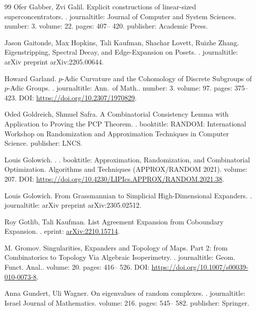 \begin{thebibliography}{99}
Ofer Gabber, Zvi Galil.
\newblock Explicit constructions of linear-sized superconcentrators.
.
\newblock journaltitle: Journal of Computer and System Sciences.
\newblock number: 3.
\newblock volume: 22.
\newblock pages: 407-- 420.
\newblock publisher: Academic Press.

Jason Gaitonde, Max Hopkins, Tali Kaufman, Shachar Lovett, Ruizhe Zhang.
\newblock Eigenstripping, Spectral Decay, and Edge-Expansion on Posets.
.
\newblock journaltitle: arXiv preprint arXiv:2205.00644.

Howard Garland.
\newblock $p$-Adic Curvature and the Cohomology of Discrete Subgroups of $p$-Adic Groups.
.
\newblock journaltitle: Ann.\ of Math..
\newblock number: 3.
\newblock volume: 97.
\newblock pages: 375-- 423.
\newblock DOI: \url{https://doi.org/10.2307/1970829}.

Oded Goldreich, Shmuel Safra.
\newblock A Combinatorial Consistency Lemma with Application to Proving the {PCP} Theorem.
.
\newblock booktitle: RANDOM: International Workshop on Randomization and Approximation Techniques in Computer Science.
\newblock publisher: LNCS.

Louis Golowich.
.
.
\newblock booktitle: Approximation, Randomization, and Combinatorial Optimization. Algorithms and Techniques (APPROX/RANDOM 2021).
\newblock volume: 207.
\newblock DOI: \url{https://doi.org/10.4230/LIPIcs.APPROX/RANDOM.2021.38}.

Louis Golowich.
\newblock From Grassmannian to Simplicial High-Dimensional Expanders.
.
\newblock journaltitle: arXiv preprint arXiv:2305.02512.

Roy Gotlib, Tali Kaufman.
\newblock List Agreement Expansion from Coboundary Expansion.
.
\newblock eprint: \url{arXiv:2210.15714}.

M. Gromov.
\newblock Singularities, Expanders and Topology of Maps. Part 2: from Combinatorics to Topology Via Algebraic Isoperimetry.
.
\newblock journaltitle: Geom. Funct. Anal..
\newblock volume: 20.
\newblock pages: 416-- 526.
\newblock DOI: \url{https://doi.org/10.1007/s00039-010-0073-8}.

Anna Gundert, Uli Wagner.
\newblock On eigenvalues of random complexes.
.
\newblock journaltitle: Israel Journal of Mathematics.
\newblock volume: 216.
\newblock pages: 545-- 582.
\newblock publisher: Springer.


\end{thebibliography}
